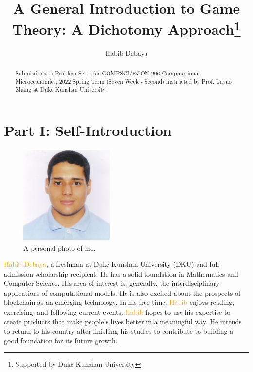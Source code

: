 \documentclass[runningheads]{llncs}
\begin{document}
%
\title{A General Introduction to Game Theory: A Dichotomy Approach\thanks{Supported by Duke Kunshan University}}
%
%
\author{Habib Debaya}
%
%
%

\maketitle              %
%
\begin{abstract}
Submissions to Problem Set 1 for COMPSCI/ECON 206 Computational Microeconomics, 2022 Spring Term (Seven Week - Second) instructed by Prof. Luyao Zhang at Duke Kunshan University. 


\end{abstract}
%
%
%
\section{Part I: Self-Introduction}
\begin{figure}
\centering
\includegraphics[width=4.7cm, height=5cm]{ph.jpg}
\caption{A personal photo of me.} \label{photo:personal}
\end{figure}

\begin{par}
\textcolor{orange}{Habib Debaya}, a freshman at Duke Kunshan University (DKU) and full admission scholarship recipient. He has a solid foundation in Mathematics and Computer Science.
His area of interest is, generally, the interdisciplinary applications of computational models. He is also excited about the prospects of blockchain as an emerging technology.
In his free time, \textcolor{orange}{Habib} enjoys reading, exercising, and following current events.
\textcolor{orange}{Habib} hopes to use his expertise to create products that make people’s lives better in a meaningful way. He intends to return to his country after finishing his studies to contribute to building a good foundation for its future growth.
\end{par}
\end{document}
